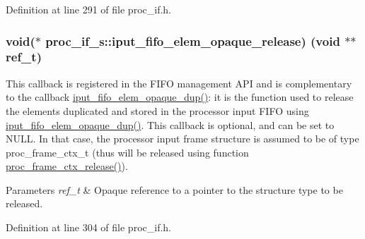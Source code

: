 Definition at line 291 of file proc\+\_\+if.\+h.

\subsubsection[{\texorpdfstring{iput\+\_\+fifo\+\_\+elem\+\_\+opaque\+\_\+release}{iput_fifo_elem_opaque_release}}]{\setlength{\rightskip}{0pt plus 5cm}void($\ast$ proc\+\_\+if\+\_\+s\+::iput\+\_\+fifo\+\_\+elem\+\_\+opaque\+\_\+release) (void $\ast$$\ast$ref\+\_\+t)}\hypertarget{structproc__if__s_aec3bf948ff945ac2f5a4c834ea3b57da}{}\label{structproc__if__s_aec3bf948ff945ac2f5a4c834ea3b57da}
This callback is registered in the F\+I\+FO management A\+PI and is complementary to the callback \textquotesingle{}\hyperlink{structproc__if__s_a558cec57df436699d4154775894f2313}{iput\+\_\+fifo\+\_\+elem\+\_\+opaque\+\_\+dup()}\textquotesingle{}\+: it is the function used to release the elements duplicated and stored in the processor input F\+I\+FO using \textquotesingle{}\hyperlink{structproc__if__s_a558cec57df436699d4154775894f2313}{iput\+\_\+fifo\+\_\+elem\+\_\+opaque\+\_\+dup()}\textquotesingle{}. This callback is optional, and can be set to N\+U\+LL. In that case, the processor input frame structure is assumed to be of type proc\+\_\+frame\+\_\+ctx\+\_\+t (thus will be released using function \textquotesingle{}\hyperlink{proc__if_8c_afad6906a6da22ba369b736863c1e204e}{proc\+\_\+frame\+\_\+ctx\+\_\+release()}\textquotesingle{}). 
\begin{DoxyParams}{Parameters}
{\em ref\+\_\+t} & Opaque reference to a pointer to the structure type to be released. \\
\hline
\end{DoxyParams}


Definition at line 304 of file proc\+\_\+if.\+h.

